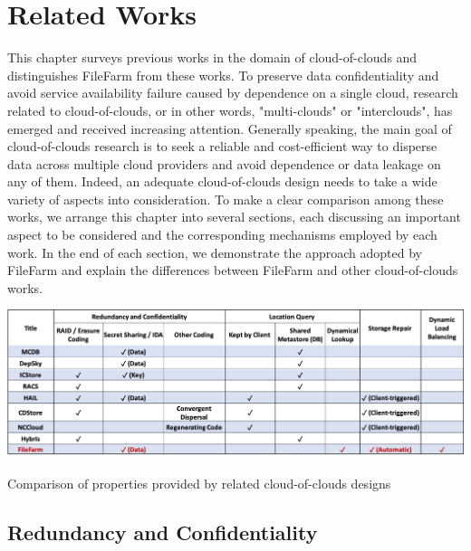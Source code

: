 \chapter{Related Works}
\label{c:related_works}

This chapter surveys previous works in the domain of cloud-of-clouds and distinguishes FileFarm from these works. To preserve data confidentiality and avoid service availability failure caused by dependence on a single cloud, research related to cloud-of-clouds, or in other words, "multi-clouds" or "interclouds", has emerged and received increasing attention. Generally speaking, the main goal of cloud-of-clouds research is to seek a reliable and cost-efficient way to disperse data across multiple cloud providers and avoid dependence or data leakage on any of them. Indeed, an adequate cloud-of-clouds design needs to take a wide variety of aspects into consideration. To make a clear comparison among these works, we arrange this chapter into several sections, each discussing an important aspect to be considered and the corresponding mechanisms employed by each work. In the end of each section, we demonstrate the approach adopted by FileFarm and explain the differences between FileFarm and other cloud-of-clouds works.

\begin{table}[!b]
\centering
  \includegraphics[width=15cm]{tables/table_property_comparison.png}
  \caption{Comparison of properties provided by related cloud-of-clouds designs}
  \label{table:propertycomparison}
\end{table}

\section{Redundancy and Confidentiality}
\label{ss:cocredundancyandconfidentiality}

